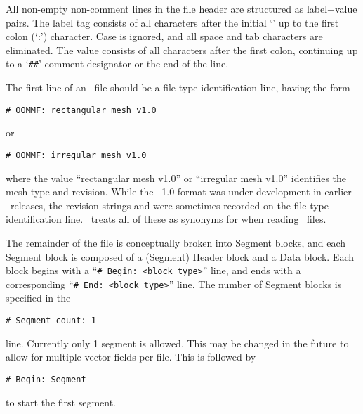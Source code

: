 All non-empty non-comment lines in the file header are structured as
label+value pairs.  The label tag consists of all characters after the
initial `\lb' up to the first colon (`:') character.  Case is ignored,
and all space and tab characters are eliminated.  The value consists
of all characters after the first colon, continuing up to a `\verb+##+'
comment designator or the end of the line.

The first line of an \OVF\ file should be a file type identification
line, having the form
\begin{verbatim}
# OOMMF: rectangular mesh v1.0
\end{verbatim}
or
\begin{verbatim}
# OOMMF: irregular mesh v1.0
\end{verbatim}
where the value ``rectangular mesh v1.0'' or ``irregular mesh v1.0''
identifies the mesh type and revision.  While the \OVF\ 1.0 format was
under development in earlier \OOMMF\ releases, the revision strings
 and  were sometimes recorded on the file type
identification line. \OOMMF\ treats all of these as synonyms for
 when reading \OVF\ files.

The remainder of the file is conceptually broken into Segment
blocks, and each Segment block is composed of a
(Segment) Header block and a Data block.  Each block begins with a
``\verb+# Begin: <block type>+'' line, and ends with a corresponding
``\verb+# End: <block type>+'' line.  The number of Segment blocks is
specified in the
\begin{verbatim}
# Segment count: 1
\end{verbatim}
line.  Currently only 1 segment is allowed.  This may be changed in
the future to allow for multiple vector fields per file.  
This is followed by
\begin{verbatim}
# Begin: Segment
\end{verbatim}
to start the first segment.

